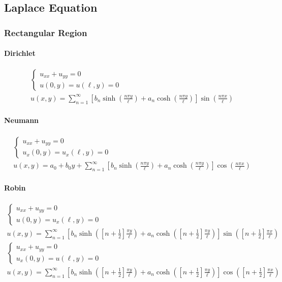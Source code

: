 \documentclass{article}
\begin{document}
\subsection{Laplace Equation}
\subsubsection*{Rectangular Region}
\paragraph{Dirichlet}
\begin{gather*}
\begin{cases}
u_{xx} + u_{yy} = 0\\
u(0,y) = u(\ell,y) = 0
\end{cases}\\
u(x,y) = \sum_{n=1}^{\infty}\left[b_{n}\sinh{\left(\frac{n\pi y}{\ell}\right)} + a_{n}\cosh{\left(\frac{n\pi y}{\ell}\right)}\right]\sin{\left(\frac{n\pi x}{\ell}\right)}
\end{gather*}

\paragraph{Neumann}
\begin{gather*}
\begin{cases}
u_{xx} + u_{yy} = 0\\
u_{x}(0,y) = u_{x}(\ell,y) = 0
\end{cases}\\
u(x,y) = a_{0} + b_{0}y + \sum_{n=1}^{\infty}\left[b_{n}\sinh{\left(\frac{n\pi y}{\ell}\right)} + a_{n}\cosh{\left(\frac{n\pi y}{\ell}\right)}\right]\cos{\left(\frac{n\pi x}{\ell}\right)}
\end{gather*}

\paragraph{Robin}
\begin{gather*}
\begin{cases}
u_{xx} + u_{yy} = 0\\
u(0,y) = u_{x}(\ell,y) = 0
\end{cases}\\
u(x,y) = \sum_{n=1}^{\infty}\left[b_{n}\sinh{\left(\left[n + \frac{1}{2}\right]\frac{\pi y}{\ell}\right)} + a_{n}\cosh{\left(\left[n + \frac{1}{2}\right]\frac{\pi y}{\ell}\right)}\right]\sin{\left(\left[n + \frac{1}{2}\right]\frac{\pi x}{\ell}\right)}
\end{gather*}
\begin{gather*}
\begin{cases}
u_{xx} + u_{yy} = 0\\
u_{x}(0,y) = u(\ell,y) = 0
\end{cases}\\
u(x,y) = \sum_{n=1}^{\infty}\left[b_{n}\sinh{\left(\left[n + \frac{1}{2}\right]\frac{\pi y}{\ell}\right)} + a_{n}\cosh{\left(\left[n + \frac{1}{2}\right]\frac{\pi y}{\ell}\right)}\right]\cos{\left(\left[n + \frac{1}{2}\right]\frac{\pi x}{\ell}\right)}
\end{gather*}
\end{document}
